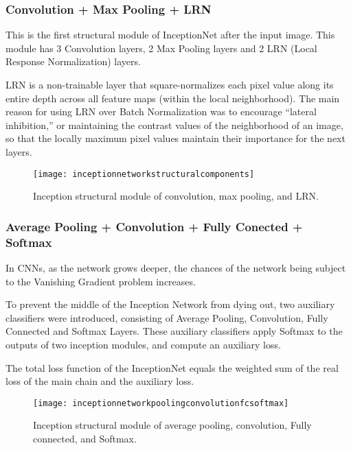 	\subsubsection{Convolution + Max Pooling + LRN}
	\begin{bulletedlist}
		\item This is the first structural module of InceptionNet after the input image. This module has 3 Convolution layers, 2 Max Pooling layers and 2 LRN (Local Response Normalization) layers.
		\item LRN is a non-trainable layer that square-normalizes each pixel value along its entire depth across all feature maps (within the local neighborhood). The main reason for using LRN over Batch Normalization was to encourage ``lateral inhibition,'' or maintaining the contrast values of the neighborhood of an image, so that the locally maximum pixel values maintain their importance for the next layers.
	\end{bulletedlist}

	\begin{figure}[tbh]
		\centering
		\texttt{[image: inceptionnetworkstructuralcomponents]}
		\caption[Inception structural module of convolution, max pooling, and LRN]{Inception structural module of convolution, max pooling, and LRN.}
		\label{fig:inceptionnetworkstructuralcomponents}
	\end{figure}

	\subsubsection{Average Pooling + Convolution + Fully Conected + Softmax}	
	\begin{bulletedlist}
		\item In CNNs, as the network grows deeper, the chances of the network being subject to the Vanishing Gradient problem increases.
		\item To prevent the middle of the Inception Network from dying out, two auxiliary classifiers were introduced, consisting of Average Pooling, Convolution, Fully Connected and Softmax Layers.  These auxiliary classifiers apply Softmax to the outputs of two inception modules, and compute an auxiliary loss.
		\item The total loss function of the InceptionNet equals the weighted sum of the real loss of the main chain and the auxiliary loss.
	\end{bulletedlist}

	\begin{figure}[tbh]
		\centering
		\texttt{[image: inceptionnetworkpoolingconvolutionfcsoftmax]}
		\caption[Inception structural module of average pooling, convolution, FC, and Softmax]{Inception structural module of average pooling, convolution, Fully connected, and Softmax.}
		\label{fig:inceptionnetworkpoolingconvolutionfcsoftmax}
	\end{figure}



